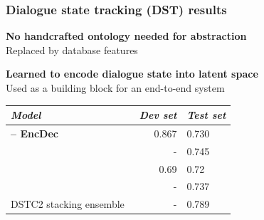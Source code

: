 \documentclass[10pt, compress,british,xcolor={svgnames,dvipsnames,x11names},trans]{beamer}
\begin{document}
\begin{frame}\frametitle{Dialogue state tracking (DST) results}
\begin{center}
   {\bf No handcrafted ontology needed for abstraction} \\
        Replaced by database features

    {\bf Learned to encode dialogue state into latent space} \\
        Used as a building block for an end-to-end system
    \vfill
\begin{tabular}{l@{\quad}rll}
\hline
\multicolumn{1}{l}{\rule{0pt}{12pt}
                   {\it Model}}&\multicolumn{1}{l}{\it Dev set}&\multicolumn{2}{l}{\it Test set}\\[2pt]
\hline\rule{0pt}{12pt}
    {\bf \citet{platek2016recurrent} -- EncDec} &   0.867 & 0.730 \\
\hline
    \citet{vodolan_hybrid_2015} & - & 0.745 \\
    \citet{zilka_incremental_2015} & 0.69 & 0.72 \\
    \citet{henderson2013deep} & - & 0.737 \\
\hline
    DSTC2 stacking ensemble~\cite{henderson2014second} & - & 0.789 \\
\hline
\end{tabular}
\end{center}
\end{frame}
\end{document}
